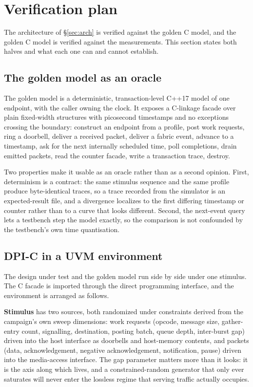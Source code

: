 \section{Verification plan}
\label{sec:verify}

The architecture of \S\ref{sec:arch} is verified against the golden C model,
and the golden C model is verified against the measurements. This section
states both halves and what each one can and cannot establish.

\subsection{The golden model as an oracle}

The golden model is a deterministic, transaction-level C++17 model of one
endpoint, with the caller owning the clock. It exposes a C-linkage facade over
plain fixed-width structures with picosecond timestamps and no exceptions
crossing the boundary: construct an endpoint from a profile, post work
requests, ring a doorbell, deliver a received packet, deliver a fabric event,
advance to a timestamp, ask for the next internally scheduled time, poll
completions, drain emitted packets, read the counter facade, write a
transaction trace, destroy.

Two properties make it usable as an oracle rather than as a second opinion.
First, determinism is a contract: the same stimulus sequence and the same
profile produce byte-identical traces, so a trace recorded from the simulator
is an expected-result file, and a divergence localizes to the first differing
timestamp or counter rather than to a curve that looks different. Second, the
next-event query lets a testbench step the model exactly, so the comparison is
not confounded by the testbench's own time quantisation.

\subsection{DPI-C in a UVM environment}

The design under test and the golden model run side by side under one
stimulus. The C facade is imported through the direct programming interface,
and the environment is arranged as follows.

\textbf{Stimulus} has two sources, both randomized under constraints derived
from the campaign's own sweep dimensions: work requests (opcode, message size,
gather-entry count, signalling, destination, posting batch, queue depth,
inter-burst gap) driven into the host interface as doorbells and host-memory
contents, and packets (data, acknowledgement, negative acknowledgement,
notification, pause) driven into the media-access interface. The gap parameter
matters more than it looks: it is the axis along which  lives, and a
constrained-random generator that only ever saturates will never enter the
lossless regime that serving traffic actually occupies.

